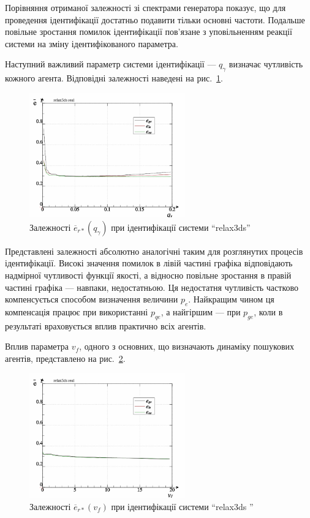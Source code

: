 Порівняння отриманої залежності зі спектрами генератора
показує, що для проведення ідентифікації достатньо подавити
тільки основні частоти. Подальше повільне зростання помилок
ідентифікації пов'язане з уповільненням реакції системи на
зміну ідентифікованого параметра.

Наступний важливий параметр системи ідентифікації ---
$ q_\gamma $ визначає чутливість кожного агента. Відповідні
залежності наведені на рис.~\ref{atu:f:relax3ds_read_id2_prm_0-p_q_gamma}.


\begin{figure}[htb!]
  \centerline{\includegraphics[width=0.6\textwidth]{p/relax3ds_read_id2_prm_0-p_q_gamma.png} }
  \caption{Залежності $ \overline{e}_{r *} (q_\gamma) $ при ідентифікації системи ``relax3ds''}
  \label{atu:f:relax3ds_read_id2_prm_0-p_q_gamma}
\end{figure}

Представлені залежності абсолютно аналогічні таким для
розглянутих процесів ідентифікації. Високі значення помилок
в лівій частині графіка відповідають надмірної чутливості
функції якості, а відносно повільне зростання в правій
частині графіка --- навпаки, недостатньою. Ця недостатня
чутливість частково компенсується способом визначення величини
$ p_e $. Найкращим чином ця компенсація працює при використанні
$ p_{qe} $, а найгіршим --- при
$ p_{ge} $, коли в результаті враховується вплив практично всіх
агентів.

Вплив параметра
$ v_f $, одного з основних, що визначають динаміку пошукових
агентів, представлено на рис.~\ref{atu:f:relax3ds_read_id2_prm_0-p_v_f}.

\begin{figure}[htb!]
  \centerline{\includegraphics[width=0.6\textwidth]{p/relax3ds_read_id2_prm_0-p_v_f.png} }
  \caption{Залежності $ \overline{e}_{r *} (v_f) $ при ідентифікації системи ``relax3ds ''}
  \label{atu:f:relax3ds_read_id2_prm_0-p_v_f}
\end{figure}


